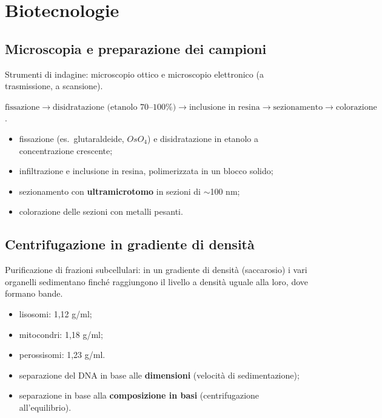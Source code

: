 \section{Biotecnologie}

\subsection{Microscopia e preparazione dei campioni}

Strumenti di indagine: microscopio ottico e microscopio elettronico (a trasmissione, a scansione).

$\text{fissazione} \rightarrow \text{disidratazione (etanolo 70--100\%)} \rightarrow \text{inclusione in resina} \rightarrow \text{sezionamento} \rightarrow \text{colorazione}$.
\begin{itemize}
  \item fissazione (es.\ glutaraldeide, $OsO_4$) e disidratazione in etanolo a concentrazione crescente;
  \item infiltrazione e inclusione in resina, polimerizzata in un blocco solido;
  \item sezionamento con \textbf{ultramicrotomo} in sezioni di $\sim$100 nm;
  \item colorazione delle sezioni con metalli pesanti.
\end{itemize}

\subsection{Centrifugazione in gradiente di densità}

Purificazione di frazioni subcellulari: in un gradiente di densità (saccarosio) i vari organelli sedimentano finché raggiungono il livello a densità uguale alla loro, dove formano bande.
\begin{itemize}
  \item lisosomi: 1,12 g/ml;
  \item mitocondri: 1,18 g/ml;
  \item perossisomi: 1,23 g/ml.
\end{itemize}

\begin{itemize}
  \item separazione del DNA in base alle \textbf{dimensioni} (velocità di sedimentazione);
  \item separazione in base alla \textbf{composizione in basi} (centrifugazione all'equilibrio).
\end{itemize}

